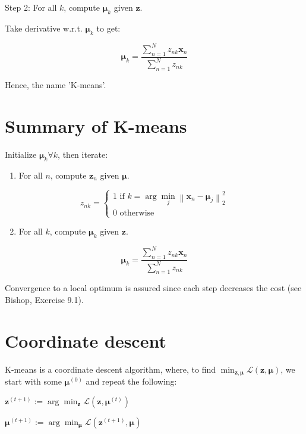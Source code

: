 Step 2: For all $k$, compute $\boldsymbol{\mu}_{k}$ given $\mathbf{z}$.

Take derivative w.r.t. $\boldsymbol{\mu}_{k}$ to get:

$$
\boldsymbol{\mu}_{k}=\frac{\sum_{n=1}^{N} z_{n k} \mathbf{x}_{n}}{\sum_{n=1}^{N} z_{n k}}
$$

Hence, the name 'K-means'.


\section*{Summary of K-means}
Initialize $\boldsymbol{\mu}_{k} \forall k$, then iterate:

\begin{enumerate}
  \item For all $n$, compute $\mathbf{z}_{n}$ given $\boldsymbol{\mu}$.
\end{enumerate}

$$
z_{n k}=\left\{\begin{array}{l}
1 \text { if } k=\arg \min _{j}\left\|\mathbf{x}_{n}-\boldsymbol{\mu}_{j}\right\|_{2}^{2} \\
0 \text { otherwise }
\end{array}\right.
$$

\begin{enumerate}
  \setcounter{enumi}{1}
  \item For all $k$, compute $\boldsymbol{\mu}_{k}$ given $\mathbf{z}$.
\end{enumerate}

$$
\boldsymbol{\mu}_{k}=\frac{\sum_{n=1}^{N} z_{n k} \mathbf{x}_{n}}{\sum_{n=1}^{N} z_{n k}}
$$

Convergence to a local optimum is assured since each step decreases the cost (see Bishop, Exercise 9.1).

\section*{Coordinate descent}
$\mathrm{K}$-means is a coordinate descent algorithm, where, to find $\min _{\boldsymbol{z}, \boldsymbol{\mu}} \mathcal{L}(\mathbf{z}, \boldsymbol{\mu})$, we start with some $\boldsymbol{\mu}^{(0)}$ and repeat the following:

$\mathbf{z}^{(t+1)}:=\arg \min _{\boldsymbol{z}} \mathcal{L}\left(\mathbf{z}, \boldsymbol{\mu}^{(t)}\right)$

$\boldsymbol{\mu}^{(t+1)}:=\arg \min _{\boldsymbol{\mu}} \mathcal{L}\left(\mathbf{z}^{(t+1)}, \boldsymbol{\mu}\right)$

